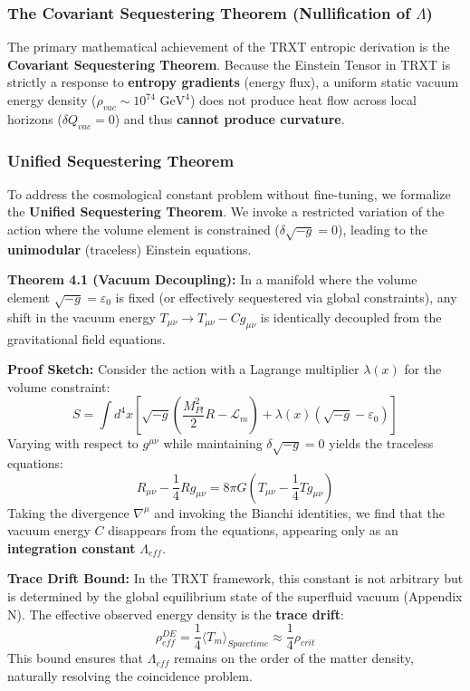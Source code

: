 \documentclass[a4paper,12pt]{article}
\begin{document}
\subsubsection{The Covariant Sequestering Theorem (Nullification of $\Lambda$)}
The primary mathematical achievement of the TRXT entropic derivation is the \textbf{Covariant Sequestering Theorem}. Because the Einstein Tensor in TRXT is strictly a response to \textbf{entropy gradients} (energy flux), a uniform static vacuum energy density ($\rho_{vac} \sim 10^{74} \text{ GeV}^4$) does not produce heat flow across local horizons ($\delta Q_{vac} = 0$) and thus \textbf{cannot produce curvature}. 

\subsubsection{Unified Sequestering Theorem}

To address the cosmological constant problem without fine-tuning, we formalize the \textbf{Unified Sequestering Theorem}. We invoke a restricted variation of the action where the volume element is constrained ($\delta \sqrt{-g} = 0$), leading to the \textbf{unimodular} (traceless) Einstein equations.

\textbf{Theorem 4.1 (Vacuum Decoupling):}
In a manifold where the volume element $\sqrt{-g} = \varepsilon_0$ is fixed (or effectively sequestered via global constraints), any shift in the vacuum energy $T_{\mu\nu} \to T_{\mu\nu} - C g_{\mu\nu}$ is identically decoupled from the gravitational field equations.

\textbf{Proof Sketch:}
Consider the action with a Lagrange multiplier $\lambda(x)$ for the volume constraint:
\begin{equation}
    S = \int d^4x \left[ \sqrt{-g} \left( \frac{M_{Pl}^2}{2} R - \mathcal{L}_m \right) + \lambda(x)(\sqrt{-g} - \varepsilon_0) \right]
\end{equation}
Varying with respect to $g^{\mu\nu}$ while maintaining $\delta \sqrt{-g} = 0$ yields the traceless equations:
\begin{equation}
    R_{\mu\nu} - \frac{1}{4} R g_{\mu\nu} = 8\pi G \left( T_{\mu\nu} - \frac{1}{4} T g_{\mu\nu} \right)
\end{equation}
Taking the divergence $\nabla^\mu$ and invoking the Bianchi identities, we find that the vacuum energy $C$ disappears from the equations, appearing only as an \textbf{integration constant} $\Lambda_{eff}$.

\textbf{Trace Drift Bound:}
In the TRXT framework, this constant is not arbitrary but is determined by the global equilibrium state of the superfluid vacuum (Appendix N). The effective observed energy density is the \textbf{trace drift}:
\begin{equation}
    \rho_{eff}^{DE} = \frac{1}{4} \langle T_m \rangle_{Spacetime} \approx \frac{1}{4} \rho_{crit}
\end{equation}
This bound ensures that $\Lambda_{eff}$ remains on the order of the matter density, naturally resolving the coincidence problem.
\end{document}
